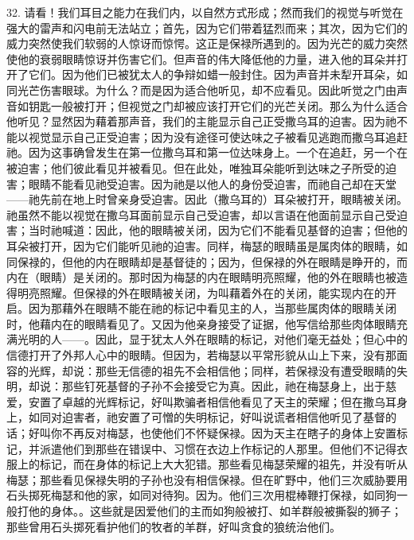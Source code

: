 32. 请看！我们耳目之能力在我们内，以自然方式形成；然而我们的视觉与听觉在强大的雷声和闪电前无法站立；首先，因为它们带着猛烈而来；其次，因为它们的威力突然使我们软弱的人惊讶而惊愕。这正是保禄所遇到的。因为光芒的威力突然使他的衰弱眼睛惊讶并伤害它们。但声音的伟大降低他的力量，进入他的耳朵并打开了它们。因为他们已被犹太人的争辩如蜡一般封住。因为声音并未犁开耳朵，如同光芒伤害眼球。为什么？而是因为适合他听见，却不应看见。因此听觉之门由声音如钥匙一般被打开；但视觉之门却被应该打开它们的光芒关闭。那么为什么适合他听见？显然因为藉着那声音，我们的主能显示自己正受撒乌耳的迫害。因为祂不能以视觉显示自己正受迫害；因为没有途径可使达味之子被看见逃跑而撒乌耳追赶祂。因为这事确曾发生在第一位撒乌耳和第一位达味身上。一个在追赶，另一个在被迫害；他们彼此看见并被看见。但在此处，唯独耳朵能听到达味之子所受的迫害；眼睛不能看见祂受迫害。因为祂是以他人的身份受迫害，而祂自己却在天堂——祂先前在地上时曾亲身受迫害。因此（撒乌耳的）耳朵被打开，眼睛被关闭。祂虽然不能以视觉在撒乌耳面前显示自己受迫害，却以言语在他面前显示自己受迫害；当时祂喊道：因此，他的眼睛被关闭，因为它们不能看见基督的迫害；但他的耳朵被打开，因为它们能听见祂的迫害。同样，梅瑟的眼睛虽是属肉体的眼睛，如同保禄的，但他的内在眼睛却是基督徒的；因为，但保禄的外在眼睛是睁开的，而内在（眼睛）是关闭的。那时因为梅瑟的内在眼睛明亮照耀，他的外在眼睛也被造得明亮照耀。但保禄的外在眼睛被关闭，为叫藉着外在的关闭，能实现内在的开启。因为那藉外在眼睛不能在祂的标记中看见主的人，当那些属肉体的眼睛关闭时，他藉内在的眼睛看见了。又因为他亲身接受了证据，他写信给那些肉体眼睛充满光明的人——。因此，显于犹太人外在眼睛的标记，对他们毫无益处；但心中的信德打开了外邦人心中的眼睛。但因为，若梅瑟以平常形貌从山上下来，没有那面容的光辉，却说：那些无信德的祖先不会相信他；同样，若保禄没有遭受眼睛的失明，却说：那些钉死基督的子孙不会接受它为真。因此，祂在梅瑟身上，出于慈爱，安置了卓越的光辉标记，好叫欺骗者相信他看见了天主的荣耀；但在撒乌耳身上，如同对迫害者，祂安置了可憎的失明标记，好叫说谎者相信他听见了基督的话；好叫你不再反对梅瑟，也使他们不怀疑保禄。因为天主在瞎子的身体上安置标记，并派遣他们到那些在错误中、习惯在衣边上作标记的人那里。但他们不记得衣服上的标记，而在身体的标记上大大犯错。那些看见梅瑟荣耀的祖先，并没有听从梅瑟；那些看见保禄失明的子孙也没有相信保禄。但在旷野中，他们三次威胁要用石头掷死梅瑟和他的家，如同对待狗。因为。他们三次用棍棒鞭打保禄，如同狗一般打他的身体。。这些就是因爱他们的主而如狗般被打、如羊群般被撕裂的狮子；那些曾用石头掷死看护他们的牧者的羊群，好叫贪食的狼统治他们。\par

